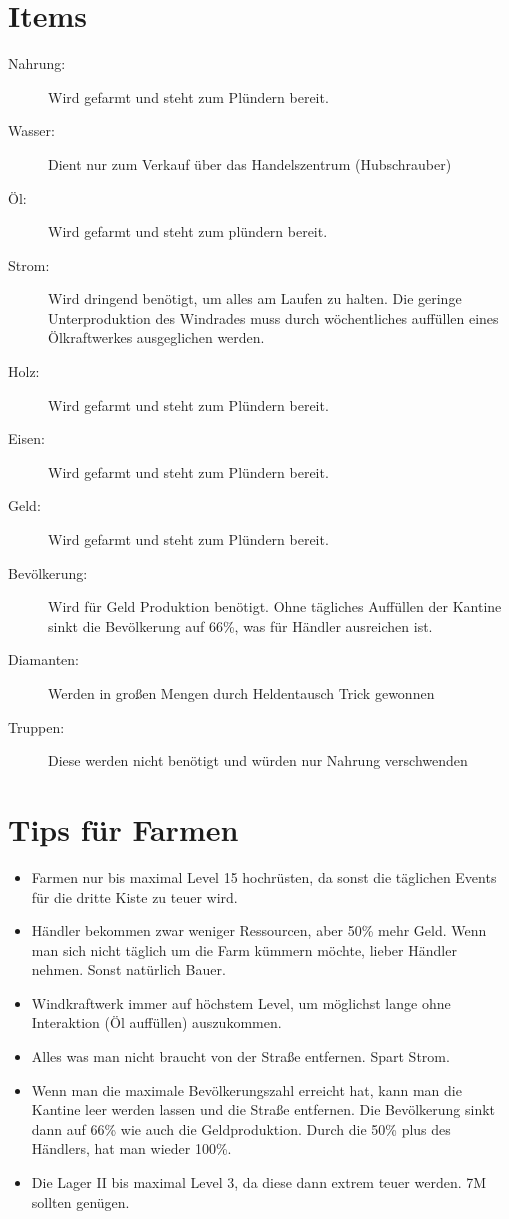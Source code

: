 \documentclass[fontsize=12pt,a4paper,draft]{scrartcl}[2003/01/01]
\begin{document}
\section{Items}

\begin{description}
  \item[Nahrung:] Wird gefarmt und steht zum Plündern bereit.
  \item[Wasser:] Dient nur zum Verkauf über das Handelszentrum (Hubschrauber)
  \item[Öl:] Wird gefarmt und steht zum plündern bereit.
  \item[Strom:] Wird dringend benötigt, um alles am Laufen zu halten. Die geringe Unterproduktion des Windrades muss durch wöchentliches auffüllen eines Ölkraftwerkes ausgeglichen werden.
  \item[Holz:] Wird gefarmt und steht zum Plündern bereit.
  \item[Eisen:] Wird gefarmt und steht zum Plündern bereit.
  \item[Geld:] Wird gefarmt und steht zum Plündern bereit.
  \item[Bevölkerung:] Wird für Geld Produktion benötigt. Ohne tägliches Auffüllen der Kantine sinkt die Bevölkerung auf 66\%, was für Händler ausreichen ist.
  \item[Diamanten:] Werden in großen Mengen durch Heldentausch Trick gewonnen
  \item[Truppen:] Diese werden nicht benötigt und würden nur Nahrung verschwenden
\end{description}



\section{Tips für Farmen}
\begin{itemize}
  \item Farmen nur bis maximal Level 15 hochrüsten, da sonst die täglichen Events für die dritte Kiste zu teuer wird.
  \item Händler bekommen zwar weniger Ressourcen, aber 50\% mehr Geld. Wenn man sich nicht täglich um die Farm kümmern möchte, lieber Händler nehmen. Sonst natürlich Bauer.
  \item Windkraftwerk immer auf höchstem Level, um möglichst lange ohne Interaktion (Öl auffüllen) auszukommen.
  \item Alles was man nicht braucht von der Straße entfernen. Spart Strom.
  \item Wenn man die maximale Bevölkerungszahl erreicht hat, kann man die Kantine leer werden lassen und die Straße entfernen. Die Bevölkerung sinkt dann auf 66\% wie auch die Geldproduktion. Durch die 50\% plus des Händlers, hat man wieder 100\%.
  \item Die Lager II bis maximal Level 3, da diese dann extrem teuer werden. 7M sollten genügen.
\end{itemize}	
\end{document}
